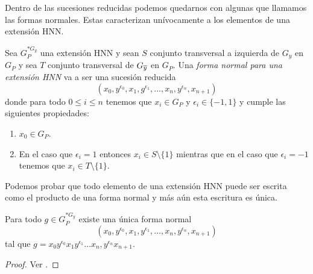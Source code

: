 \documentclass[tesis.tex]{subfiles}
\begin{document}
Dentro de las sucesiones reducidas podemos quedarnos con algunas que llamamos las formas normales.
Estas caracterizan unívocamente a los elementos de una extensión HNN.

\begin{deff}
	Sea $G_P^{\ast G_y}$ una extensión HNN  y sean $S$ conjunto transversal a izquierda de $G_y$ en $G_P$ y sea $T$ conjunto transversal de $G_{\overline y}$ en $G_P$.
	Una \emph{forma normal para una extensión HNN} va a ser una sucesión reducida
	\[
	(x_{0},y^{\epsilon_0},x_{1},g^{\epsilon_1}, \dots, x_{n},y^{\epsilon_n},x_{n+1})
	\]
	donde para todo $0 \le i \le n$ tenemos que $x_{i} \in G_{P}$ y $\epsilon_{i} \in \{ -1,1 \}$ y cumple las siguientes propiedades:
	\begin{enumerate}
		\item $x_0 \in G_P$.
		\item En el caso que $\epsilon_{i} = 1$ entonces $x_i \in S \setminus \{ 1\}$ mientras que en el caso que $\epsilon_{i} = -1$ tenemos que $x_{i} \in T \setminus \{ 1 \}$.
	\end{enumerate}
\end{deff}

Podemos probar que todo elemento de una extensión HNN puede ser escrita como el producto de una forma normal y más aún esta escritura es única.
 
\begin{teo}
	Para todo $g \in G_P^{\ast G_y}$ existe una única forma normal 
	\[
	(x_{0},y^{\epsilon_0},x_{1},y^{\epsilon_1}, \dots, x_{n},y^{\epsilon_n},x_{n+1})
	\]
	tal que $g = x_{0}y^{\epsilon_0}x_{1}y^{\epsilon_1} \dots x_{n},y^{\epsilon_n}x_{n+1}$.
\end{teo}
\begin{proof}
	Ver \cite[p.182]{lyndon1977combinatorial}.
\end{proof}
\end{document}

